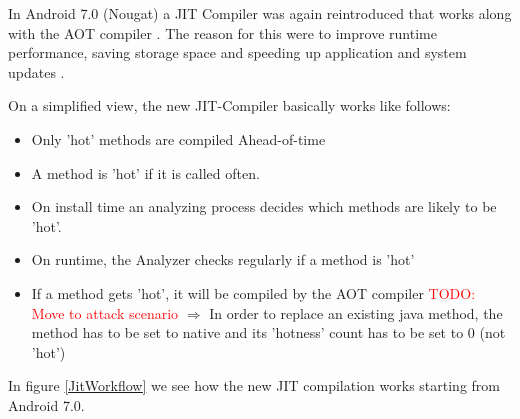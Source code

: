 In Android 7.0 (Nougat) a JIT Compiler was again reintroduced that works along with the AOT compiler \cite{Android7ForDevelopers}. The reason for this were to improve runtime performance, saving storage space and speeding up application and system updates \cite{JitWorkFlow}.

On a simplified view, the new JIT-Compiler basically works like follows:  


\begin{itemize}
    \item Only 'hot' methods are compiled Ahead-of-time 
    \item A method is 'hot' if it is called often.
    \item On install time an analyzing process decides which methods are likely to be 'hot'.
    \item On runtime, the Analyzer checks regularly if a method is 'hot'
    \item If a method gets 'hot', it will be compiled by the AOT compiler
    \textcolor{red}{TODO: Move to attack scenario}
    $\Rightarrow$ In order to replace an existing java method, the method has to be set to native and its 'hotness' count has to be set to 0 (not 'hot')
    \end{itemize}
    
In figure \ref{JitWorkflow} we see how the new JIT compilation works starting from Android 7.0.     
    
